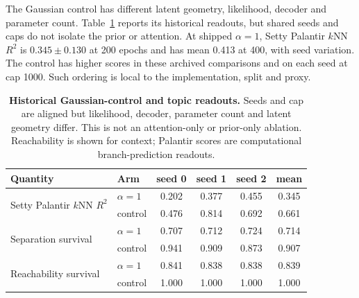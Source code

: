 \documentclass[11pt]{article}
\begin{document}
The Gaussian control has different latent geometry, likelihood, decoder and parameter count. Table~\ref{tab:control} reports its historical readouts, but shared seeds and caps do not isolate the prior or attention. At shipped $\alpha=1$, Setty Palantir $k$NN $R^2$ is $0.345\pm0.130$ at 200 epochs and has mean 0.413 at 400, with seed variation. The control has higher scores in these archived comparisons and on each seed at cap 1000. Such ordering is local to the implementation, split and proxy.
\begin{table}[htbp]
\centering
\caption{\textbf{Historical Gaussian-control and topic readouts.} Seeds and cap are aligned but likelihood, decoder, parameter count and latent geometry differ. This is not an attention-only or prior-only ablation. Reachability is shown for context; Palantir scores are computational branch-prediction readouts.}
\label{tab:control}
\small
\setlength{\tabcolsep}{5pt}
\begin{tabular}{llcccc}
\toprule
Quantity & Arm & seed 0 & seed 1 & seed 2 & mean \\
\midrule
\multirow{2}{*}{Setty Palantir $k$NN $R^2$}
 & $\alpha=1$ & 0.202 & 0.377 & 0.455 & 0.345 \\
 & control & 0.476 & 0.814 & 0.692 & 0.661 \\
\midrule
\multirow{2}{*}{Separation survival}
 & $\alpha=1$ & 0.707 & 0.712 & 0.724 & 0.714 \\
 & control & 0.941 & 0.909 & 0.873 & 0.907 \\
\midrule
\multirow{2}{*}{Reachability survival}
 & $\alpha=1$ & 0.841 & 0.838 & 0.838 & 0.839 \\
 & control & 1.000 & 1.000 & 1.000 & 1.000 \\
\bottomrule
\end{tabular}
\end{table}
\begin{table}[htbp]
\centering
\caption{\textbf{400-epoch Setty low-concentration check.} Three topic runs and three Gaussian controls complete 400 epochs. Degenerate topic allocations retain perplexity near one; coherence and branch scores are n.q. because the ratio is degenerate. The control has no native topic allocation.}
\label{tab:alpha0p1400}
\scriptsize
\setlength{\tabcolsep}{3.5pt}

\end{table}
\begin{table}[htbp]
\centering
\caption{\textbf{Setty rows from the historical 1000-cap transformer subset.} The model-specific archive contains 48 runs across four backgrounds. An asterisk marks early stopping; actual completed epochs are printed per seed. Dashes mark non-native Gaussian allocations. Degenerate coherence and branch readouts are n.q.; the old zero sentinels remain only in immutable archives.}
\label{tab:shipped1000}
\footnotesize
\setlength{\tabcolsep}{2pt}

\end{table}
\end{document}
